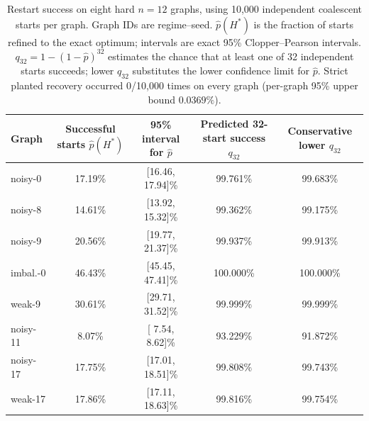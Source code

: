 \begin{table}[t]
\centering
\caption{Restart success on eight hard $n=12$ graphs, using 10,000 independent
coalescent starts per graph. Graph IDs are regime--seed. $\hat p(H^*)$ is the
fraction of starts refined to the exact optimum; intervals are exact 95\%
Clopper--Pearson intervals. $q_{32}=1-(1-\hat p)^{32}$ estimates the chance
that at least one of 32 independent starts succeeds; lower $q_{32}$ substitutes
the lower confidence limit for $\hat p$. Strict planted recovery occurred
0/10,000 times on every graph (per-graph 95\% upper bound $0.0369\%$).}
\label{tab:basin-mc}
\small
\begin{tabular*}{\textwidth}{@{\extracolsep{\fill}}lcccc@{}}
\toprule
Graph
& \shortstack{Successful starts\\$\hat p(H^*)$}
& \shortstack{95\% interval\\for $\hat p$}
& \shortstack{Predicted 32-start\\success $q_{32}$}
& \shortstack{Conservative\\lower $q_{32}$} \\
\midrule
noisy-0  & 17.19\% & [16.46, 17.94]\% & 99.761\% & 99.683\% \\
noisy-8  & 14.61\% & [13.92, 15.32]\% & 99.362\% & 99.175\% \\
noisy-9  & 20.56\% & [19.77, 21.37]\% & 99.937\% & 99.913\% \\
imbal.-0 & 46.43\% & [45.45, 47.41]\% & 100.000\% & 100.000\% \\
weak-9   & 30.61\% & [29.71, 31.52]\% & 99.999\% & 99.999\% \\
noisy-11 &  8.07\% & [ 7.54,  8.62]\% & 93.229\% & 91.872\% \\
noisy-17 & 17.75\% & [17.01, 18.51]\% & 99.808\% & 99.743\% \\
weak-17  & 17.86\% & [17.11, 18.63]\% & 99.816\% & 99.754\% \\
\bottomrule
\end{tabular*}
\end{table}
